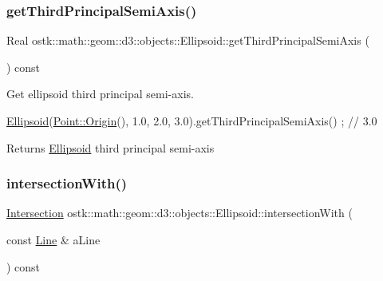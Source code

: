 \subsubsection{\texorpdfstring{get\+Third\+Principal\+Semi\+Axis()}{getThirdPrincipalSemiAxis()}}
{\footnotesize\ttfamily Real ostk\+::math\+::geom\+::d3\+::objects\+::\+Ellipsoid\+::get\+Third\+Principal\+Semi\+Axis (\begin{DoxyParamCaption}{ }\end{DoxyParamCaption}) const}



Get ellipsoid third principal semi-\/axis. 


\begin{DoxyCode}
\hyperlink{classostk_1_1math_1_1geom_1_1d3_1_1objects_1_1_ellipsoid_acd84276f65a14db12623402a411712b7}{Ellipsoid}(\hyperlink{classostk_1_1math_1_1geom_1_1d3_1_1objects_1_1_point_a079c199f08b015d456d02728a71b534c}{Point::Origin}(), 1.0, 2.0, 3.0).getThirdPrincipalSemiAxis() ; \textcolor{comment}{// 3.0}
\end{DoxyCode}


\begin{DoxyReturn}{Returns}
\hyperlink{classostk_1_1math_1_1geom_1_1d3_1_1objects_1_1_ellipsoid}{Ellipsoid} third principal semi-\/axis 
\end{DoxyReturn}
\mbox{\label{classostk_1_1math_1_1geom_1_1d3_1_1objects_1_1_ellipsoid_a18e2c5add63d0f1ed857a3cda95ceb10}} 
\subsubsection{\texorpdfstring{intersection\+With()}{intersectionWith()}\hspace{0.1cm}{\footnotesize\ttfamily [1/5]}}
{\footnotesize\ttfamily \hyperlink{classostk_1_1math_1_1geom_1_1d3_1_1_intersection}{Intersection} ostk\+::math\+::geom\+::d3\+::objects\+::\+Ellipsoid\+::intersection\+With (\begin{DoxyParamCaption}\item[{const \hyperlink{classostk_1_1math_1_1geom_1_1d3_1_1objects_1_1_line}{Line} \&}]{a\+Line }\end{DoxyParamCaption}) const}



